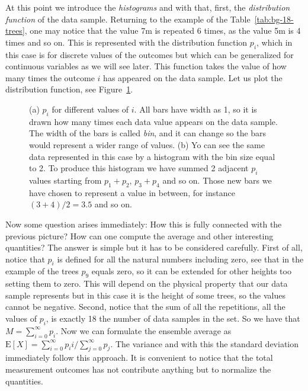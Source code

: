 At this point we introduce the \emph{histograms} and with that, first, the \emph{distribution function} of the data sample.
Returning to the example of the Table~\ref{tab:bg-18-trees}, one may notice that the value 7m is repeated 6 times, as the value 5m is 4 times and so on.
This is represented with the distribution function $p_i$, which in this case is for discrete values of the outcomes but which can be generalized for continuous variables as we will see later.
This function takes the value of how many times the outcome $i$ has appeared on the data sample.
Let us plot the distribution function, see Figure~\ref{fig:bg-histograms}.
\begin{figure}[tp]
  \centering
  \caption{(a) $p_i$ for different values of $i$. All bars have width as 1, so it is drawn how many times each data value appears on the data sample.
  The width of the bars is called \emph{bin}, and it can change so the bars would represent a wider range of values. (b) Yo can see the same data represented in this case by a histogram with the bin size equal to 2. To produce this histogram we have summed 2 adjacent $p_i$ values starting from $p_1+p_2$, $p_3+p_4$ and so on.
  Those new bars we have chosen to represent a value in between, for instance $(3+4)/2=3.5$ and so on.}
  \label{fig:bg-histograms}
\end{figure}

Now some question arises immediately:
How this is fully connected with the previous picture?
How can one compute the average and other interesting quantities?
The answer is simple but it has to be considered carefully.
First of all, notice that $p_i$ is defined for all the natural numbers including zero, see that in the example of the trees $p_9$ equals zero, so it can be extended for other heights too setting them to zero.
This will depend on the physical property that our data sample represents but in this case it is the height of some trees, so the values cannot be negative.
Second, notice that the sum of all the repetitions, all the values of $p_i$, is exactly 18 the number of data samples in the set.
So we have that $M = \sum_{i=0}^{\infty} p_i$.
Now we can formulate the ensemble average as $\text{E}[X]=\sum_{i=0}^{\infty} p_i i / \sum_{j=0}^{\infty} p_j$. The variance and with this the standard deviation immediately follow this approach.
It is convenient to notice that the total measurement outcomes has not contribute anything but to normalize the quantities.

